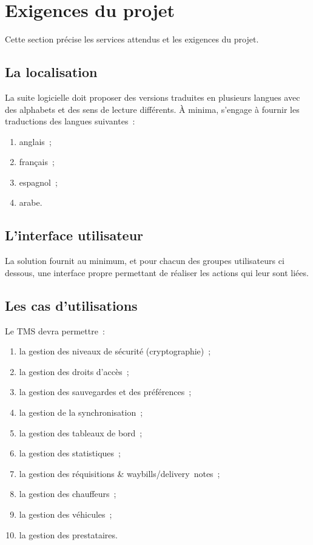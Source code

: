 \section{Exigences du projet}
Cette section précise les services attendus et les exigences du projet.

\subsection{La localisation}
La suite logicielle doit proposer des versions traduites en plusieurs langues avec des alphabets et des sens de lecture différents. À minima, \amo s'engage à fournir les traductions des langues suivantes~:
\begin{enumerate}
	\item anglais~;
	\item français~;
	\item espagnol~;
	\item arabe.
\end{enumerate}

\subsection{L'interface utilisateur}
La solution fournit au minimum, et pour chacun des groupes utilisateurs ci dessous, une interface propre permettant de réaliser les actions qui leur sont liées.

\subsection{Les cas d'utilisations}
Le TMS devra permettre~:
\begin{enumerate}
	\item la gestion des niveaux de sécurité (cryptographie)~;
	\item la gestion des droits d'accès~;
	\item la gestion des sauvegardes et des préférences~; 
	\item la gestion de la synchronisation~;
	\item la gestion des tableaux de bord~;
	\item la gestion des statistiques~;
	\item la gestion des réquisitions \& waybills/delivery~notes~;
	\item la gestion des chauffeurs~;
	\item la gestion des véhicules~;
	\item la gestion des prestataires.
\end{enumerate}

